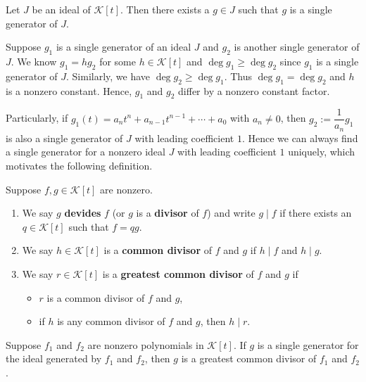 \documentclass{ctexart}
\begin{document}
    \begin{mythm}
        Let $J$ be an ideal of $\mathcal K[t]$. Then there exists a $g\in J$ such that $g$ is a single generator of $J$.
    \end{mythm}
    \begin{myrmk}
        Suppose $g_1$ is a single generator of an ideal $J$ and $g_2$ is another single generator of $J$. We know $g_1 = h g_2$ for some $h\in \mathcal K[t]$ and $\deg g_1 \ge \deg g_2$ since $g_1$ is a single generator of $J$. Similarly, we have $\deg g_2 \ge \deg g_1$. Thus $\deg g_1 = \deg g_2$ and $h$ is a nonzero constant. Hence, $g_1$ and $g_2$ differ by a nonzero constant factor.

        Particularly, if $g_1(t) = a_n t^n + a_{n-1} t^{n-1} + \cdots + a_0$ with $a_n \ne 0$, then $g_2 := \dfrac{1}{a_n} g_1$ is also a single generator of $J$ with leading coefficient $1$. Hence we can always find a single generator for a nonzero ideal $J$ with leading coefficient $1$ uniquely, which motivates the following definition.
    \end{myrmk}
    \begin{mydef}
        Suppose $f,g\in \mathcal K[t]$ are nonzero.
        \begin{enumerate}[label=(\arabic*)]
            \item We say $g$ \textbf{devides} $f$ (or $g$ is a \textbf{divisor} of $f$) and write $g \mid f$ if there exists an $q\in \mathcal K[t]$ such that $f = qg$.
            \item We say $h\in \mathcal{K}[t]$ is a \textbf{common divisor} of $f$ and $g$ if $h \mid f$ and $h \mid g$.
            \item We say $r\in \mathcal K[t]$ is a \textbf{greatest common divisor} of $f$ and $g$ if
            \begin{itemize}
                \item $r$ is a common divisor of $f$ and $g$,
                \item if $h$ is any common divisor of $f$ and $g$, then $h \mid r$.
            \end{itemize}
        \end{enumerate}
    \end{mydef}
    \begin{mythm}\label{thm: single generator is gcd}
        Suppose $f_1$ and $f_2$ are nonzero polynomials in $\mathcal K[t]$. If $g$ is a single generator for the ideal generated by $f_1$ and $f_2$, then $g$ is a greatest common divisor of $f_1$ and $f_2$.
    \end{mythm}
\end{document}
